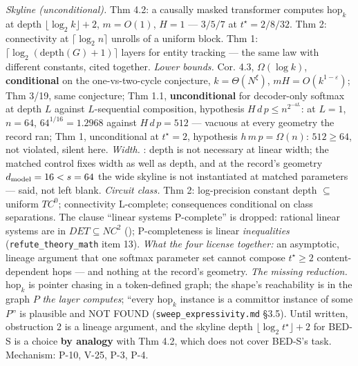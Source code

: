 \documentclass[11pt,a4paper]{article}
\theoremstyle{plain}
\theoremstyle{definition}
\theoremstyle{remark}
\begin{document}
\emph{Skyline (unconditional).} \citep{sanford-2024-logdepth} Thm 4.2: a
causally masked transformer computes \(\mathrm{hop}_k\) at depth
\(\lfloor\log_2k\rfloor+2\), \(m=O(1)\), \(H=1\) --- \(3/5/7\) at
\(t^\star=2/8/32\). \citep{merrill-2025-littledepth} Thm 2: connectivity
at \(\lceil\log_2n\rceil\) unrolls of a uniform block.
\citep{fagnou-2024-chacal} Thm 1:
\(\lceil\log_2(\mathrm{depth}(G)+1)\rceil\) layers for entity tracking
--- the same law with different constants, cited together. \emph{Lower
bounds.} \citep{sanford-2024-logdepth} Cor. 4.3, \(\Omega(\log k)\),
\textbf{conditional} on the one-vs-two-cycle conjecture,
\(k=\Theta(N^\xi)\), \(mH=O(k^{1-\varepsilon})\);
\citep{sanford-2024-graph-algorithms} Thm 3/19, same conjecture;
\citep{chen-2024-multilayer} Thm 1.1, \textbf{unconditional} for
decoder-only softmax at depth \(L\) against \(L\)-sequential
composition, hypothesis \(H\,d\,p\le n^{2^{-4L}}\): at \(L=1\),
\(n=64\), \(64^{1/16}=1.2968\) against \(H\,d\,p=512\) --- vacuous at
every geometry the record ran; \citep{sanford-2024-inductionheads} Thm
1, unconditional at \(t^\star=2\), hypothesis \(h\,m\,p=\Omega(n)\):
\(512\ge64\), not violated, silent here. \emph{Width.}
\citep{yehudai-2025-depthwidth}: depth is not necessary at linear width;
the matched control fixes width as well as depth, and at the record's
geometry \(d_{\rm model}=16<s=64\) the wide skyline is not instantiated
at matched parameters --- said, not left blank. \emph{Circuit class.}
\citep{merrill-2023-parallelism} Thm 2: log-precision constant depth
\(\subseteq\) uniform \(TC^0\); connectivity L-complete; consequences
conditional on class separations. The clause ``linear systems
P-complete'' is dropped: rational linear systems are in
\(DET\subseteq NC^2\) (\citep{cook-1985-taxonomy}); P-completeness is
linear \emph{inequalities} (\texttt{refute\_theory\_math} item 13).
\emph{What the four license together:} an asymptotic, lineage argument
that one softmax parameter set cannot compose \(t^\star\ge2\)
content-dependent hops --- and nothing at the record's geometry.
\emph{The missing reduction.} \(\mathrm{hop}_k\) is pointer chasing in a
token-defined graph; the shape's reachability is in the graph \(P\)
\emph{the layer computes}; ``every \(\mathrm{hop}_k\) instance is a
committor instance of some \(P\)'' is plausible and NOT FOUND
(\texttt{sweep\_expressivity.md} §3.5). Until written, obstruction 2 is
a lineage argument, and the skyline depth
\(\lfloor\log_2t^\star\rfloor+2\) for BED-S is a choice \textbf{by
analogy} with Thm 4.2, which does not cover BED-S's task. Mechanism:
P-10, V-25, P-3, P-4.
\end{document}

